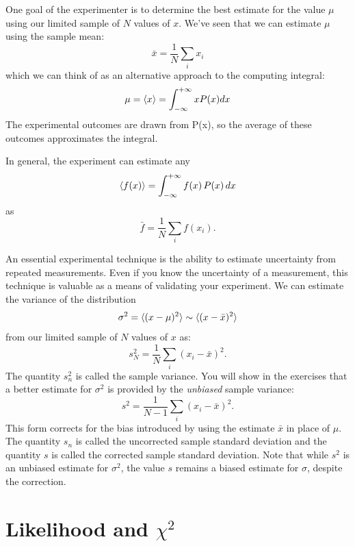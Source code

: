 \documentclass[12pt,oneside]{book}
\begin{document}
One goal of the experimenter is to determine the best estimate for the
value $\mu$ using our limited sample of $N$ values of $x$.  We've seen that we can estimate $\mu$ using the sample mean:
\begin{displaymath}
\bar{x} = \frac{1}{N} \sum_i x_i
\end{displaymath}
which we can think of as an alternative approach to the computing integral:
\begin{displaymath}
\mu = \braket{x} = \int_{-\infty}^{+\infty} x P(x) dx
\end{displaymath}
The experimental outcomes are drawn from P(x), so the average of these outcomes approximates the integral.

In general, the experiment can estimate any
\begin{displaymath}
\braket{f(x)} = \int_{-\infty}^{+\infty} f(x) \, P(x) \, dx
\end{displaymath}
as
\begin{displaymath}
\bar{f} = \frac{1}{N} \sum_i f(x_i). 
\end{displaymath}

An essential experimental technique is the ability to estimate
uncertainty from repeated measurements.  Even if you know the
uncertainty of a measurement, this technique is valuable as a means of
validating your experiment.  We can estimate the variance of the distribution
\begin{displaymath}
 \sigma^2 = \braket{(x-\mu)^2} \sim \braket{(x - \bar{x})^2}
\end{displaymath}
from our limited sample of $N$ values of $x$ as:
\begin{displaymath}
s_N^2  = \frac{1}{N} \sum_i (x_i-\bar{x})^2.
\end{displaymath}
The quantity $s_n^2$ is called the sample variance.  You will show in
the exercises that a better estimate for $\sigma^2$ is provided by the {\em unbiased}
sample variance:
\begin{equation}
\label{eqn:sampvar}
s^2  = \frac{1}{N-1} \sum_i (x_i-\bar{x})^2.
\end{equation}
This form corrects for the bias introduced by using the estimate
$\bar{x}$ in place of $\mu$.  The quantity $s_n$ is called the
uncorrected sample standard deviation and the quantity $s$ is called
the corrected sample standard deviation.  Note that while $s^2$ is an
unbiased estimate for $\sigma^2$, the value $s$ remains a biased
estimate for $\sigma$, despite the correction.

\section{Likelihood and $\chi^2$ }
\end{document}
